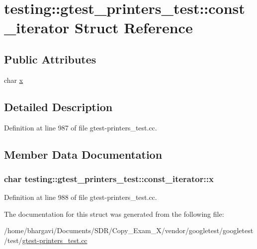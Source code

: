 \hypertarget{structtesting_1_1gtest__printers__test_1_1const__iterator}{}\section{testing\+:\+:gtest\+\_\+printers\+\_\+test\+:\+:const\+\_\+iterator Struct Reference}
\label{structtesting_1_1gtest__printers__test_1_1const__iterator}
\subsection*{Public Attributes}
\begin{DoxyCompactItemize}
\item 
char \hyperlink{structtesting_1_1gtest__printers__test_1_1const__iterator_a4412dbc1c37c2bc5211971f0c8176d6b}{x}
\end{DoxyCompactItemize}


\subsection{Detailed Description}


Definition at line 987 of file gtest-\/printers\+\_\+test.\+cc.



\subsection{Member Data Documentation}
\subsubsection[{\texorpdfstring{x}{x}}]{\setlength{\rightskip}{0pt plus 5cm}char testing\+::gtest\+\_\+printers\+\_\+test\+::const\+\_\+iterator\+::x}\hypertarget{structtesting_1_1gtest__printers__test_1_1const__iterator_a4412dbc1c37c2bc5211971f0c8176d6b}{}\label{structtesting_1_1gtest__printers__test_1_1const__iterator_a4412dbc1c37c2bc5211971f0c8176d6b}


Definition at line 988 of file gtest-\/printers\+\_\+test.\+cc.



The documentation for this struct was generated from the following file\+:\begin{DoxyCompactItemize}
\item 
/home/bhargavi/\+Documents/\+S\+D\+R/\+Copy\+\_\+\+Exam\+\_\+X/vendor/googletest/googletest/test/\hyperlink{gtest-printers__test_8cc}{gtest-\/printers\+\_\+test.\+cc}\end{DoxyCompactItemize}

